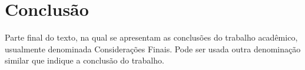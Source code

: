 \chapter{Conclusão}\label{cap:conclusoeseperspectivas}

Parte final do texto, na qual se apresentam as conclusões do trabalho acadêmico, usualmente denominada Considerações Finais. Pode ser usada outra denominação similar que indique a conclusão do trabalho.
